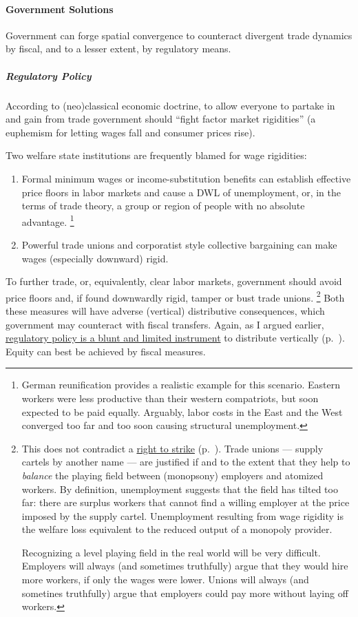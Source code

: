 \paragraph{Government Solutions}
Government can forge spatial convergence to counteract divergent trade dynamics by fiscal, and to a lesser extent, by regulatory means.

\subparagraph{Regulatory Policy}
According to (neo)classical economic doctrine, to allow everyone to partake in and gain from trade government should ``fight factor market rigidities'' (a euphemism for letting wages fall and consumer prices rise).

Two welfare state institutions are frequently blamed for wage rigidities:
\begin{enumerate}
	\item Formal minimum wages or income-substitution benefits can establish effective price floors in labor markets and cause a \gls{DWL} of unemployment, or, in the terms of trade theory, a group or region of people with no absolute advantage.
	\footnote{
		German reunification provides a realistic example for this scenario.
		Eastern workers were less productive than their western compatriots, but soon expected to be paid equally.
		Arguably, labor costs in the East and the West converged too far and too soon causing structural unemployment.
	}

	\item Powerful trade unions and corporatist style collective bargaining can make wages (especially downward) rigid.
\end{enumerate}

To further trade, or, equivalently, clear labor markets, government should avoid price floors and, if found downwardly rigid, tamper or bust trade unions.
\footnote{
	This does not contradict a \hyperref[sec:redistributive-policy]{right to strike} (p.~\pageref{sec:redistributive-policy}).
	Trade unions --- supply cartels by another name --- are justified if and to the extent that they help to \emph{balance} the playing field between (monopsony) employers and atomized workers.
	By definition, unemployment suggests that the field has tilted too far:
	there are surplus workers that cannot find a willing employer at the price imposed by the supply cartel.
	Unemployment resulting from wage rigidity is the welfare loss equivalent to the reduced output of a monopoly provider.

	Recognizing a level playing field in the real world will be very difficult.
	Employers will always (and sometimes truthfully) argue that they would hire more workers, if only the wages were lower.
	Unions will always (and sometines truthfully) argue that employers could pay more without laying off workers.
}
Both these measures will have adverse (vertical) distributive consequences, which government may counteract with fiscal transfers.
Again, as I argued earlier, \hyperref[sec:redistributive-policy]{regulatory policy is a blunt and limited instrument} to distribute vertically (p.~\pageref{sec:redistributive-policy}).
Equity can best be achieved by fiscal measures.

